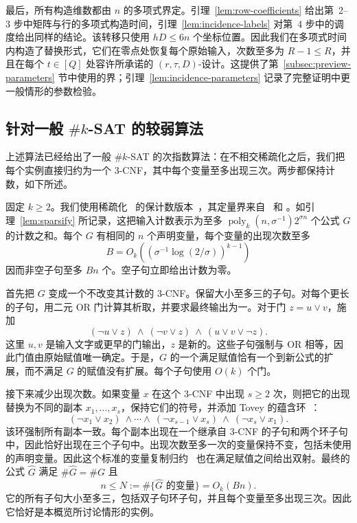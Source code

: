 \documentclass[11pt,reqno]{amsart}
\numberwithin{equation}{section}
\theoremstyle{definition}\newtheorem{definition}[theorem]{定义}
\theoremstyle{remark}\newtheorem{remark}[theorem]{注}
\renewcommand{\le}{\leqslant}
\renewcommand{\ge}{\geqslant}
\begin{document}
最后，所有构造维数都由 $n$ 的多项式界定。引理~\ref{lem:row-coefficients} 给出第~2--3 步中矩阵与行的多项式构造时间，引理~\ref{lem:incidence-labels} 对第~4 步中的调度给出同样的结论。该转移只使用 $hD\le6n$ 个坐标位置。因此我们在多项式时间内构造了替换形式，它们在零点处恢复每个原始输入，次数至多为 $R-1\le R$，并且在每个 $t\in[Q]$ 处容许所承诺的 $(r,\tau,D)$-设计。这提供了第~\ref{subsec:preview-parameters} 节中使用的界；引理~\ref{lem:incidence-parameters} 记录了完整证明中更一般情形的参数检验。

\subsection{针对一般 \texorpdfstring{$\#k$-SAT}{\#k-SAT} 的较弱算法}
\label{subsec:preview-general-sat}
上述算法已经给出了一般 $\#k$-SAT 的次指数算法：在不相交稀疏化之后，我们把每个实例直接归约为一个 $3$-CNF，其中每个变量至多出现三次。两步都保持计数，如下所述。

固定 $k\ge2$。我们使用稀疏化~\cite{IPZ} 的保计数版本~\cite[附录~A]{DHMTW}，其定量界来自~\cite[第~6 节]{CIP} 和 \cite[引理~5.14 与方程~(5.4)]{CalabroThesis}。如引理~\ref{lem:sparsify} 所记录，这把输入计数表示为至多 $\operatorname{poly}_k(n,\sigma^{-1})2^{\sigma n}$ 个公式 $G$ 的计数之和。每个 $G$ 有相同的 $n$ 个声明变量，每个变量的出现次数至多
\[
 B=O_k\!\left((\sigma^{-1}\log(2/\sigma))^{k-1}\right)
\]
因而非空子句至多 $Bn$ 个。空子句立即给出计数为零。

首先把 $G$ 变成一个不改变其计数的 $3$-CNF。保留大小至多三的子句。对每个更长的子句，用二元 OR 门计算其析取，并要求最终输出为一。对于门 $z=u\vee v$，施加
\[
 (\neg u\vee z)\ \wedge\ (\neg v\vee z)\ \wedge\
 (u\vee v\vee\neg z).
\]
这里 $u,v$ 是输入文字或更早的门输出，$z$ 是新的。这些子句强制与 OR 相等，因此门值由原始赋值唯一确定。于是，$G$ 的一个满足赋值恰有一个到新公式的扩展，而不满足 $G$ 的赋值没有扩展。每个子句使用 $O(k)$ 个门。

接下来减少出现次数。如果变量 $x$ 在这个 $3$-CNF 中出现 $s\ge2$ 次，则把它的出现替换为不同的副本 $x_1,\ldots,x_s$，保持它们的符号，并添加 Tovey 的蕴含环~\cite[第~86 页]{Tov84}：
\[
 (\neg x_1\vee x_2)\ \wedge\cdots\wedge\
 (\neg x_{s-1}\vee x_s)\ \wedge\ (\neg x_s\vee x_1).
\]
该环强制所有副本一致。每个副本出现在一个继承自 $3$-CNF 的子句和两个环子句中，因此恰好出现在三个子句中。出现次数至多一次的变量保持不变，包括未使用的声明变量。因此这个标准的变量复制归约~\cite[命题~4.7]{Gol08} 也在满足赋值之间给出双射。最终的公式 $\widehat G$ 满足 $\#\widehat G=\#G$ 且
\[
 n\le N:=\#\{\text{$\widehat G$ 的变量}\}=O_k(Bn).
\]
它的所有子句大小至多三，包括双子句环子句，并且每个变量至多出现三次。因此它恰好是本概览所讨论情形的实例。
\end{document}

